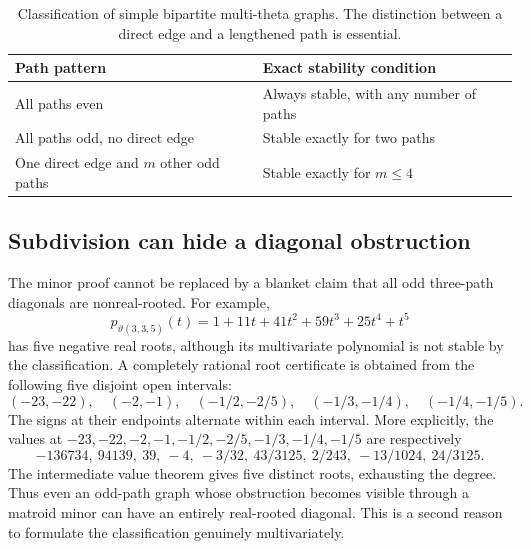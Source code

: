 \documentclass[11pt]{article}
\numberwithin{equation}{section}
\theoremstyle{definition}
\begin{document}
\begin{table}[htbp]
\centering
\begin{tabular}{p{}p{}}
\toprule
Path pattern & Exact stability condition\\
\midrule
All paths even & Always stable, with any number of paths\\
All paths odd, no direct edge & Stable exactly for two paths\\
One direct edge and $m$ other odd paths & Stable exactly for $m\le4$\\
\bottomrule
\end{tabular}
\caption{Classification of simple bipartite multi-theta graphs.
The distinction between a direct edge and a lengthened path is essential.}
\label{ade:tab:thetas}
\end{table}

\subsection{Subdivision can hide a diagonal obstruction}

The minor proof cannot be replaced by a blanket claim that all odd
three-path diagonals are nonreal-rooted.  For example,
\begin{equation}
 p_{\vartheta(3,3,5)}(t)
 =1+11t+41t^2+59t^3+25t^4+t^5
 \label{ade:eq:theta335}
\end{equation}
has five negative real roots, although its multivariate polynomial is
not stable by the classification.
A completely rational root certificate is obtained from the following
five disjoint open intervals:
\begin{equation}
 (-23,-22),\quad(-2,-1),\quad(-1/2,-2/5),\quad
 (-1/3,-1/4),\quad(-1/4,-1/5).
 \label{ade:eq:theta335intervals}
\end{equation}
The signs at their endpoints alternate within each interval.  More
explicitly, the values at
$-23,-22,-2,-1,-1/2,-2/5,-1/3,-1/4,-1/5$ are respectively
\[
 -136734,\ 94139,\ 39,\ -4,\ -3/32,\ 43/3125,\
 2/243,\ -13/1024,\ 24/3125.
\]
The intermediate value theorem gives five distinct roots, exhausting the
degree.  Thus even an odd-path graph whose obstruction becomes visible
through a matroid minor can have an entirely real-rooted diagonal.
This is a second reason to formulate the classification genuinely
multivariately.
\end{document}
